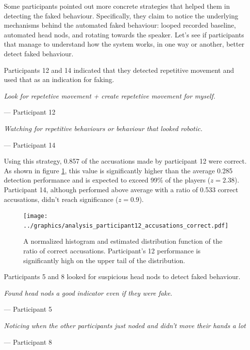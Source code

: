 \documentclass[]{simple-thesis}
\begin{document}
Some participants pointed out more concrete strategies that helped them in detecting the faked behaviour.
Specifically, they claim to notice the underlying mechanisms behind the automated faked behaviour: looped recorded baseline, automated head nods, and rotating towards the speaker.
Let's see if participants that manage to understand how the system works, in one way or another, better detect faked behaviour.

Participants 12 and 14 indicated that they detected repetitive movement and used that as an indication for faking.

\begin{displayquote}
  \textit{Look for repetetive movement + create repetetive movement for myself.}

  \hfill
  --- Participant 12

  \textit{Watching for repetitive behaviours or behaviour that looked robotic.}

  \hfill
  --- Participant 14
\end{displayquote}

Using this strategy, 0.857 of the accusations made by participant 12 were correct.
As shown in figure \ref{fig:analysis:analysis_participant12_accusations_correct}, this value is significantly higher than the average 0.285 detection performance and is expected to exceed 99\% of the players ($z = 2.38$).
Participant 14, although performed above average with a ratio of 0.533 correct accusations, didn't reach significance ($z = 0.9$).

\begin{figure}
  \centering
  \texttt{[image: ../graphics/analysis\_participant12\_accusations\_correct.pdf]}
  \caption{A normalized histogram and estimated distribution function of the ratio of correct accusations. Participant's 12 performance is significantly high on the upper tail of the distribution.}
  \label{fig:analysis:analysis_participant12_accusations_correct}
\end{figure}

Participants 5 and 8 looked for suspicious head nods to detect faked behaviour.

\begin{displayquote}
  \textit{Found head nods a good indicator even if they were fake.}

  \hfill
  --- Participant 5

  \textit{Noticing when the other participants just noded and didn't move their hands a lot}

  \hfill
  --- Participant 8
\end{displayquote}
\end{document}
